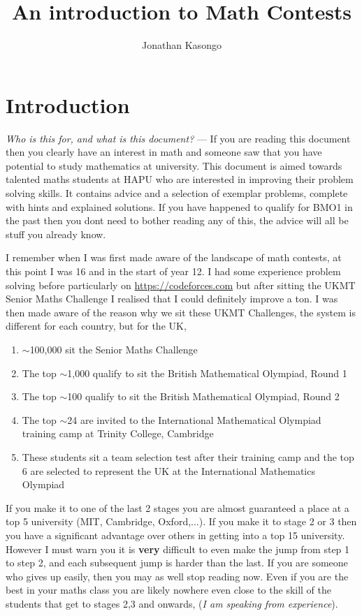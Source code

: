 \documentclass{article}
\author{Jonathan Kasongo}
\title{An introduction to Math Contests}
\begin{document}
\maketitle

\tableofcontents

\section{Introduction}
\textit{Who is this for, and what is this document?} ---
If you are reading this document then you clearly have an interest in math
and someone saw that you have potential to study mathematics at university.
This document is aimed towards talented maths students at HAPU who are
interested in improving their problem solving skills. It contains advice and
a selection of exemplar problems, complete with hints and explained solutions.
If you have happened to qualify for BMO1 in the past then you dont need to
bother reading any of this, the advice will all be stuff you already know.
\vspace{0.2cm}

I remember when I was first made aware of the landscape of math contests,
at this point I was 16 and in the start of year 12. I had some experience
problem solving before particularly on \url{https://codeforces.com} but
after sitting the UKMT Senior Maths Challenge I realised that I could
definitely improve a ton. I was then made aware of the reason why we sit
these UKMT Challenges, the system is different for each country, but for
the UK,

\begin{enumerate}
\item $\sim$100,000 sit the Senior Maths Challenge
\item The top $\sim$1,000 qualify to sit the British Mathematical Olympiad, Round 1
\item The top $\sim$100 qualify to sit the British Mathematical Olympiad, Round 2
\item The top $\sim$24 are invited to the International Mathematical Olympiad training camp at Trinity College, Cambridge
\item These students sit a team selection test after their training camp and the top 6 are selected to represent the UK at the International Mathematics Olympiad
\end{enumerate}

If you make it to one of the last 2 stages you are almost guaranteed a place at a top 5 university (MIT, Cambridge, Oxford,...).
If you make it to stage 2 or 3 then you have a significant advantage over others in getting into a top 15 university. However I
must warn you it is \textbf{very} difficult to even make the jump from step 1 to step 2, and each subsequent jump is harder than the
last. If you are someone who gives up easily, then you may as well stop reading now. Even if you are the best in your maths class you
are likely nowhere even close to the skill of the students that get to stages
2,3 and onwards, (\textit{I am speaking from experience}).\\
\end{document}
